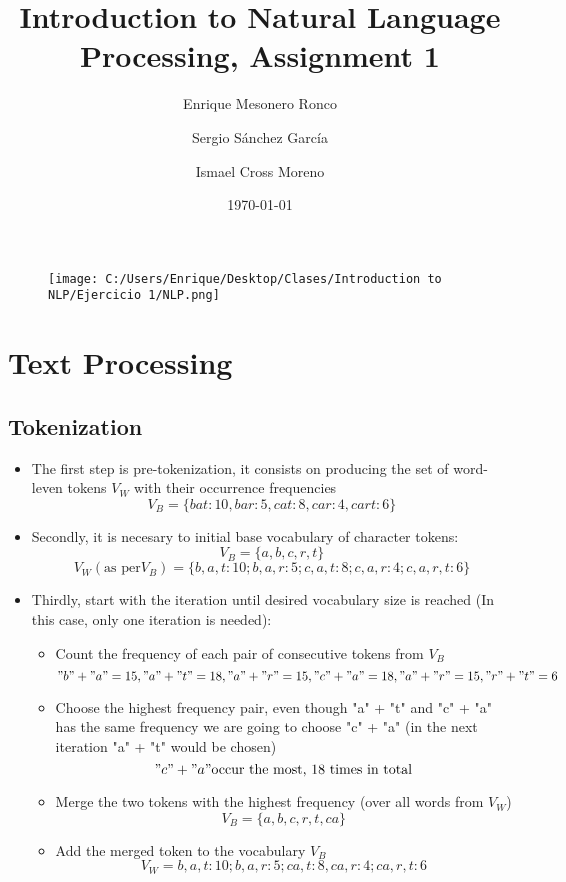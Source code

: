 \documentclass{article}
\title{ Introduction to Natural Language Processing, Assignment 1 }
\author{ Enrique Mesonero Ronco \and Sergio Sánchez García \and Ismael Cross Moreno }
\date{\today}
\begin{document}
\maketitle
\begin{figure}[h!]
	\texttt{[image: C:/Users/Enrique/Desktop/Clases/Introduction to NLP/Ejercicio 1/NLP.png]}
\end{figure}
\newpage
\tableofcontents
\newpage
\section { Text Processing }
	\subsection { Tokenization }
	 \begin{itemize}
	\item The first step is pre-tokenization, it consists on producing the set of word-leven tokens $V_W$ with their occurrence frequencies
		\begin{equation*}
			V_B = \{ bat: 10, bar: 5, cat: 8, car: 4, cart: 6 \}
		\end{equation*}
	\item Secondly, it is necesary to initial base vocabulary of character tokens:
		\begin{equation*}
			V_B = \{a,b,c,r,t\}
		\end{equation*}
		\begin{equation*}
			V_W (\text{as per} V_B) = \{b, a, t: 10; b, a, r: 5; c, a, t: 8; c, a, r: 4; c, a, r, t: 6\}
		\end{equation*}

	\item Thirdly, start with the iteration until desired vocabulary size is reached (In this case, only one iteration is needed):
		\begin{itemize}
		\item Count the frequency of each pair of consecutive tokens from $V_B$
		\begin{equation*}
			"b" + "a" = 15, "a" + "t" = 18, "a" + "r"  = 15, "c" + "a" = 18, "a" + "r" = 15, "r" + "t" = 6
		\end{equation*}
		\item Choose the highest frequency pair, even though "a" + "t" and "c" + "a" has the same frequency we are going to choose "c" + "a" (in the next iteration "a" + "t" would be chosen)
		\begin{equation*}
			"c" + "a" \text{occur the most, 18 times in total}
		\end{equation*}
		\item Merge the two tokens with the highest frequency (over all words from $V_W$)
		\begin{equation*}
			V_B=\{a,b,c,r,t,ca\}
		\end{equation*}
		\item Add the merged token to the vocabulary $V_B$
		\begin{equation*}
			V_W={b, a, t: 10; b, a, r: 5; ca, t: 8, ca, r: 4; ca, r, t: 6}
		\end{equation*}
		\end{itemize}
	\end{itemize}
\end{document}
